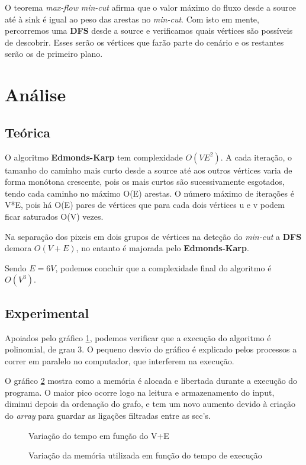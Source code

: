 \documentclass[12pt,a4paper]{article}
\begin{document}
O teorema \textit{max-flow} \textit{min-cut} afirma que o valor máximo do fluxo desde a source até à sink é igual ao peso das arestas no
\textit{min-cut}. Com isto em mente, percorremos uma \textbf{DFS} desde a source e verificamos quais vértices são possíveis de descobrir.
Esses serão os vértices que farão parte do cenário e os restantes serão os de primeiro plano.

\section{Análise}
\subsection{Teórica}
O algoritmo \textbf{Edmonds-Karp} tem complexidade $O(V{E}^2)$. A cada iteração, o tamanho do caminho mais curto desde a source até
aos outros vértices varia de forma monótona crescente, pois os mais curtos são sucessivamente esgotados, tendo cada
caminho no máximo O(E) arestas. O número máximo de iterações é V*E, pois há O(E) pares de vértices que para cada dois
vértices u e v podem ficar saturados O(V) vezes.

Na separação dos pixeis em dois grupos de vértices na deteção do \textit{min-cut} a \textbf{DFS} demora $O(V+E)$, no entanto é majorada
pelo \textbf{Edmonds-Karp}.

Sendo $E=6V$, podemos concluir que a complexidade final do algoritmo é $O({V}^3)$.

\subsection{Experimental}
Apoiados pelo gráfico \ref{g1}, podemos verificar que a execução do algoritmo é polinomial, de grau 3.
O pequeno desvio do gráfico é explicado pelos processos a correr em paralelo no computador, que interferem na execução.

O gráfico \ref{g2} mostra como a memória é alocada e libertada durante a execução do programa. O maior pico ocorre logo na leitura e armazenamento do input, diminui depois da ordenação do grafo, e tem
um novo aumento devido à criação do \textit{array} para guardar as ligações filtradas entre as scc's.
\begin{figure}[h]
			\centering
			\caption{Variação do tempo em função do V+E}
			\label{g1}
\end{figure}
\begin{figure}[h]
			\centering
			\caption{Variação da memória utilizada em função do tempo de execução}
			\label{g2}
\end{figure}
\end{document}
